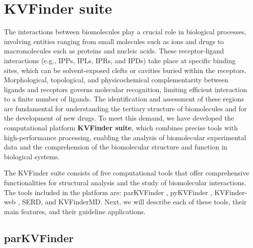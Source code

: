 \documentclass[Ingles]{phdthesis}
\def\eg{e.g.\onedot}
\begin{document}



\chapter{KVFinder suite \label{ch:kvfinder-suite}}

The interactions between biomolecules play a crucial role in biological processes, involving entities ranging from small molecules such as ions and drugs to macromolecules such as proteins and nucleic acids. These receptor-ligand interactions (\eg, IPPs, IPLs, IPRs, and IPDs) take place at specific binding sites, which can be solvent-exposed clefts or cavities buried within the receptors. Morphological, topological, and physicochemical complementarity between ligands and receptors governs molecular recognition, limiting efficient interaction to a finite number of ligands. The identification and assessment of these regions are fundamental for understanding the tertiary structure of biomolecules and for the development of new drugs. To meet this demand, we have developed the computational platform \textbf{KVFinder suite}, which combines precise tools with high-performance processing, enabling the analysis of biomolecular experimental data and the comprehension of the biomolecular structure and function in biological systems.

The KVFinder suite consists of five computational tools that offer comprehensive functionalities for structural analysis and the study of biomolecular interactions. The tools included in the platform are: parKVFinder \cite{guerra2019,guerra2020}, pyKVFinder \cite{guerra2021}, KVFinder-web \cite{guerra2023A}, SERD, and KVFinderMD. Next, we will describe each of these tools, their main features, and their guideline applications.

\section{parKVFinder \label{sec:parkvfinder}}
\end{document}
